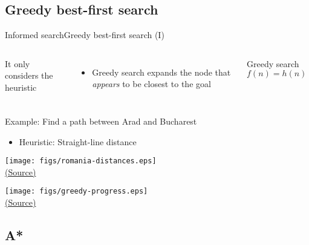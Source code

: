 \documentclass[10pt,compress]{beamer} %
\begin{document}
\subsection{Greedy best-first search}

\begin{frame}{Informed search}{Greedy best-first search (I)}
    \begin{columns}
            It only considers the heuristic
            \begin{itemize}
                \item Greedy search expands the node that \textit{appears} to be closest to the goal
            \end{itemize}

            \begin{block}{Greedy search}
                $f(n) = h (n)$
            \end{block}
    \end{columns}
    
    \bigskip

    Example: Find a path between Arad and Bucharest
    \begin{itemize}
        \item Heuristic: Straight-line distance
    \end{itemize}

    \centering \texttt{[image: figs/romania-distances.eps]}\\
    \tiny{\href{http://aima.cs.berkeley.edu/index.html}{(Source)}}
\end{frame}

\begin{frame}
      \begin{center}
          \texttt{[image: figs/greedy-progress.eps]}\\
          \tiny{\href{http://aima.cs.berkeley.edu/index.html}{(Source)}}
      \end{center}
\end{frame}

\subsection{A*}
\end{document}

